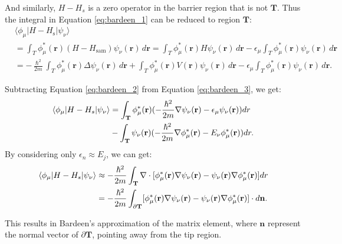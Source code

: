And similarly, $H - H_s$ is a zero operator in the barrier region that is not $\mathbf{T}$. Thus the integral in Equation \ref{eq:bardeen_1} can be reduced to region $\mathbf{T}$:   
\begin{equation}
	\label{eq:bardeen_3}
	\begin{aligned}
		&\langle \phi_{\mu} | H - H_{\text{s}} | \psi_{\nu} \rangle \\
		&= \int_{T} \phi_{\mu}^*(\mathbf{r}) \left( H - H_{\text{sam}} \right) \psi_{\nu}(\mathbf{r}) \, d\mathbf{r} 
		= \int_{T} \phi_{\mu}^*(\mathbf{r}) H \psi_{\nu}(\mathbf{r}) \, d\mathbf{r} 
		- \epsilon_{\mu} \int_{T} \phi_{\mu}^*(\mathbf{r}) \psi_{\nu}(\mathbf{r}) \, d\mathbf{r} \\
		&= -\frac{\hslash^2}{2m} \int_{T} \phi_{\mu}^*(\mathbf{r}) \Delta \psi_{\nu}(\mathbf{r}) \, d\mathbf{r} 
		+ \int_{T} \phi_{\mu}^*(\mathbf{r}) V(\mathbf{r}) \psi_{\nu}(\mathbf{r}) \, d\mathbf{r} 
		- \epsilon_{\mu} \int_{T} \phi_{\mu}^*(\mathbf{r}) \psi_{\nu}(\mathbf{r}) \, d\mathbf{r}.
	\end{aligned}
\end{equation}

Subtracting Equation \ref{eq:bardeen_2} from Equation \ref{eq:bardeen_3}, we get: 
\begin{equation}
	\label{eq:bardeen_matrixelement}
	\begin{aligned}
		\braket{\phi_{\mu}|H-H_s|\psi_{\nu}} &= \int_\mathbf{T}\phi_{\mu}^*(\mathbf{r})(-\frac{\hslash^2}{2m} \nabla \psi_{\nu}(\mathbf{r}) - \epsilon_{\mu}\psi_{\nu}(\mathbf{r}))dr \\ 
		& - \int_\mathbf{T}\psi_{\nu}(\mathbf{r})(-\frac{\hslash^2}{2m} \nabla \phi_{\mu}^*(\mathbf{r}) - E_{\nu}\phi_{\mu}^*(\mathbf{r}))dr.
	\end{aligned}
\end{equation}
By considering only $\epsilon_n \approx E_j$, we can get:
\begin{align}
	\label{eq:bardeen4}
	\braket{\phi_{\mu}|H-H_s|\psi_{\nu}} &\approx -\frac{\hslash^2}{2m}\int_\mathbf{T}\nabla \cdot [\phi_{\mu}^*(\mathbf{r})\nabla\psi_{\nu}(\mathbf{r})-\psi_{\nu}(\mathbf{r})\nabla\phi_{\mu}^*(\mathbf{r})]dr\\ \label{eq:bardeen5}
	& = -\frac{\hslash^2}{2m}\int_{\partial\mathbf{T}}[\phi_{\mu}^*(\mathbf{r})\nabla\psi_{\nu}(\mathbf{r})-\psi_{\nu}(\mathbf{r})\nabla\phi_{\mu}^*(\mathbf{r})]\cdot d\mathbf{n}.
\end{align}

This results in Bardeen's approximation of the matrix element, where $\mathbf{n}$ represent the normal vector of $\partial\mathbf{T}$, pointing away from the tip region.  

